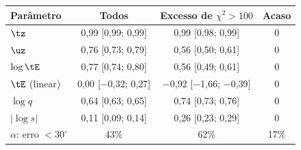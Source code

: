 \begin{tabular}{lccc}
	\toprule
	Parâmetro & Todos & Excesso de $\chi^2 > 100$ & Acaso \\
	\midrule
	$\tz$ & 0{,}99 [0{,}99; 0{,}99] & 0{,}99 [0{,}98; 0{,}99] & 0 \\
	$\uz$ & 0{,}76 [0{,}73; 0{,}79] & 0{,}56 [0{,}50; 0{,}61] & 0 \\
	$\log \tE$ & 0{,}77 [0{,}74; 0{,}80] & 0{,}56 [0{,}49; 0{,}61] & 0 \\
	$\tE$ (linear) & 0{,}00 [\ensuremath{-}0{,}32; 0{,}27] & \ensuremath{-}0{,}92 [\ensuremath{-}1{,}66; \ensuremath{-}0{,}39] & 0 \\
	$\log q$ & 0{,}64 [0{,}63; 0{,}65] & 0{,}74 [0{,}73; 0{,}76] & 0 \\
	$|\log s|$ & 0{,}11 [0{,}09; 0{,}14] & 0{,}26 [0{,}23; 0{,}29] & 0 \\
	$\alpha$: erro $< 30^\circ$ & 43\% & 62\% & 17\% \\
	\bottomrule
\end{tabular}
